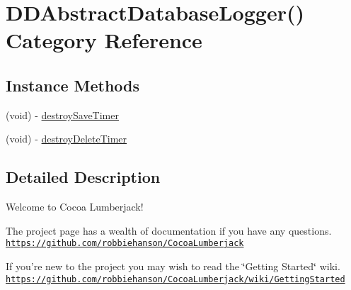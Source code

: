 \hypertarget{category_d_d_abstract_database_logger_07_08}{\section{D\-D\-Abstract\-Database\-Logger() Category Reference}
\label{category_d_d_abstract_database_logger_07_08}
}
\subsection*{Instance Methods}
\begin{DoxyCompactItemize}
\item 
(void) -\/ \hyperlink{category_d_d_abstract_database_logger_07_08_a83a362cf7ea04434bbce7f9f38f957c4}{destroy\-Save\-Timer}
\item 
(void) -\/ \hyperlink{category_d_d_abstract_database_logger_07_08_a0aa62056e1901936b72be99a021f46b6}{destroy\-Delete\-Timer}
\end{DoxyCompactItemize}


\subsection{Detailed Description}
Welcome to Cocoa Lumberjack!

The project page has a wealth of documentation if you have any questions. \href{https://github.com/robbiehanson/CocoaLumberjack}{\tt https\-://github.\-com/robbiehanson/\-Cocoa\-Lumberjack}

If you're new to the project you may wish to read the \char`\"{}\-Getting Started\char`\"{} wiki. \href{https://github.com/robbiehanson/CocoaLumberjack/wiki/GettingStarted}{\tt https\-://github.\-com/robbiehanson/\-Cocoa\-Lumberjack/wiki/\-Getting\-Started} 

